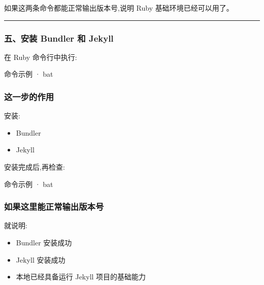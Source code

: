 \documentclass[lang=cn,scheme=chinese,color=blue,device=normal,toc=onecol,math=cm]{elegantbook}
\begin{document}
如果这两条命令都能正常输出版本号,说明 Ruby 基础环境已经可以用了。\par


\medskip\hrule\medskip


\subsubsection{五、安装 Bundler 和 Jekyll}


在 Ruby 命令行中执行:\par


\begin{inlinecodebox}{命令示例 · bat}
\end{inlinecodebox}


\subsubsection{这一步的作用}


安装:\par


\begin{itemize}
\item Bundler
\item Jekyll
\end{itemize}


安装完成后,再检查:\par


\begin{inlinecodebox}{命令示例 · bat}
\end{inlinecodebox}


\subsubsection{如果这里能正常输出版本号}


就说明:\par


\begin{itemize}
\item Bundler 安装成功
\item Jekyll 安装成功
\item 本地已经具备运行 Jekyll 项目的基础能力
\end{itemize}
\end{document}
